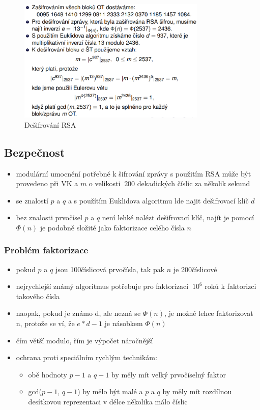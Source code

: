 \documentclass{szzclass}
\begin{document}
\begin{figure}[h!]
    \centering
    \includegraphics[width=0.8\textwidth]{topics/bi-spol-06/image/rsaDecrypt.png}
    \caption{Dešifrování RSA}
\end{figure}
\subsection{Bezpečnost}
\begin{itemize}
    \item modulární umocnění potřebné k šifrování zprávy s použitím RSA může být provedeno při VK a $m$ o velikosti $~200$ dekadických číslic za několik sekund
    \item se znalostí $p$ a $q$ a s použítím Euklidova algoritmu lde najit dešifrovací klíč $d$
    \item bez znalosti prvočísel $p$ a $q$ není lehké nalézt dešifrovací klíč, najít je pomocí $\Phi(n)$ je podobně složité jako faktorizace celého čísla $n$
\end{itemize}
\subsubsection{Problém faktorizace}
\begin{itemize}
    \item pokud $p$ a $q$ jsou 100číslicová prvočísla, tak pak $n$ je 200číslicové
    \item nejrychlejší známý algoritmus potřebuje pro faktorizaci $~10^6$ roků k faktorizci takového čísla
    \item naopak, pokud je známo d, ale nezná se $\Phi(n)$, je možné lehce faktorizovat n, protože se ví, že $e*d - 1$ je násobkem $\Phi(n)$
    \item čím větší modulo, řím je výpočet náročnější
    \item ochrana proti speciálním rychlým technikám:
    \begin{itemize}
        \item obě hodnoty $p-1$ a $q-1$ by měly mít velký prvočíselný faktor
        \item gcd($p-1$, $q-1$) by mělo být malé a $p$ a $q$ by měly mít rozdílnou desítkovou reprezentaci v délce několika málo číslic
    \end{itemize}
\end{itemize}
\end{document}

